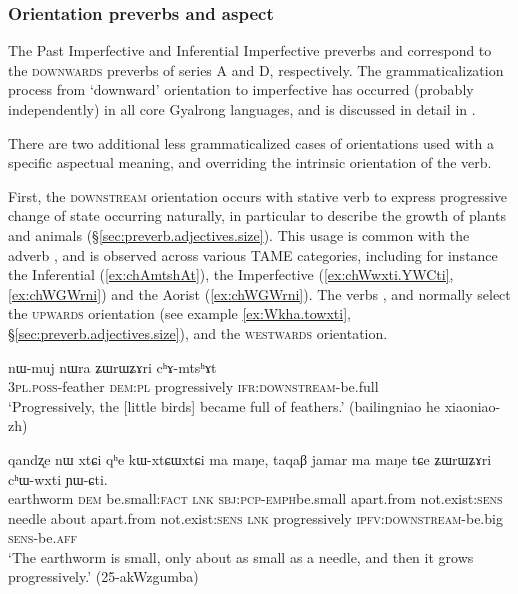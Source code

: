 \subsubsection{Orientation preverbs and aspect} \label{sec:orientation.preverb.aspect}
The Past Imperfective and Inferential Imperfective preverbs  and  correspond to the \textsc{downwards} preverbs of series A and D, respectively. The grammaticalization process from `downward' orientation to imperfective has occurred (probably independently) in all core Gyalrong languages, and is discussed in detail in \citet{lin11direction}.

There are two additional less grammaticalized cases of orientations used with a specific aspectual meaning, and overriding the intrinsic orientation of the verb.

First, the \textsc{downstream} orientation occurs with stative verb to express progressive change of state occurring naturally, in particular to describe the growth of plants and animals (§\ref{sec:preverb.adjectives.size}). This usage is common with the adverb , and is observed across various TAME categories, including for instance the Inferential (\ref{ex:chAmtshAt}), the Imperfective (\ref{ex:chWwxti.YWCti}, \ref{ex:chWGWrni}) and the Aorist (\ref{ex:chWGWrni}). The verbs , and  normally select the \textsc{upwards} orientation (see example \ref{ex:Wkha.towxti}, §\ref{sec:preverb.adjectives.size}), and  the \textsc{westwards} orientation.

\begin{exe}
\ex \label{ex:chAmtshAt}
\gll nɯ-muj nɯra ʑɯrɯʑɤri cʰɤ-mtsʰɤt   \\
 \textsc{3pl}.\textsc{poss}-feather \textsc{dem}:\textsc{pl} progressively \textsc{ifr}:\textsc{downstream}-be.full \\
\glt `Progressively, the [little birds] became full of feathers.' (bailingniao he xiaoniao-zh)
\end{exe}

\begin{exe}
\ex \label{ex:chWwxti.YWCti}
\gll qandʐe nɯ xtɕi qʰe kɯ-xtɕɯ\redp{}xtɕi ma maŋe, taqaβ jamar ma maŋe tɕe ʑɯrɯʑɤri cʰɯ-wxti ɲɯ-ɕti. \\
earthworm \textsc{dem} be.small:\textsc{fact} \textsc{lnk} \textsc{sbj}:\textsc{pcp}-\textsc{emph}\redp{}be.small apart.from not.exist:\textsc{sens} needle about apart.from not.exist:\textsc{sens} \textsc{lnk} progressively \textsc{ipfv}:\textsc{downstream}-be.big \textsc{sens}-be.\textsc{aff} \\
\glt `The earthworm is small, only about as small as a needle, and then it grows progressively.' (25-akWzgumba)  
\end{exe}

